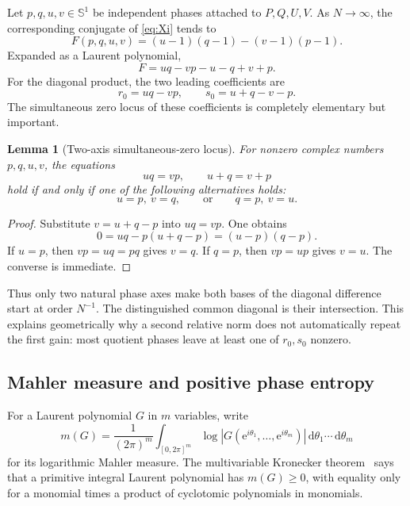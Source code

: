 \documentclass[11pt]{article}
\newtheorem{lemma}[theorem]{Lemma}
\theoremstyle{definition}
\theoremstyle{remark}
\newcommand{\e}{\mathrm e}
\newcommand{\dd}{\,\mathrm d}
\newcommand{\abs}[1]{\left|#1\right|}
\begin{document}
Let $p,q,u,v\in\mathbb S^1$ be independent phases attached to $P,Q,U,V$.
As $N\to\infty$, the corresponding conjugate of \eqref{eq:Xi} tends to
\begin{equation}\label{eq:phasesymbol}
 F(p,q,u,v)=(u-1)(q-1)-(v-1)(p-1).
\end{equation}
Expanded as a Laurent polynomial,
\begin{equation}\label{eq:Fexpanded}
 F=uq-vp-u-q+v+p.
\end{equation}
For the diagonal product, the two leading coefficients are
\begin{equation}\label{eq:r0s0}
 r_0=uq-vp,
 \qquad
 s_0=u+q-v-p.
\end{equation}
The simultaneous zero locus of these coefficients is completely elementary but
important.

\begin{lemma}[Two-axis simultaneous-zero locus]\label{lem:twoaxis}
For nonzero complex numbers $p,q,u,v$, the equations
\[
 uq=vp,
 \qquad
 u+q=v+p
\]
hold if and only if one of the following alternatives holds:
\begin{equation}\label{eq:axes}
 u=p,\ v=q,
 \qquad\text{or}\qquad
 q=p,\ v=u.
\end{equation}
\end{lemma}

\begin{proof}
Substitute $v=u+q-p$ into $uq=vp$.  One obtains
\[
 0=uq-p(u+q-p)=(u-p)(q-p).
\]
If $u=p$, then $vp=uq=pq$ gives $v=q$.  If $q=p$, then $vp=up$ gives $v=u$.
The converse is immediate.
\end{proof}

Thus only two natural phase axes make both bases of the diagonal difference
start at order $N^{-1}$.  The distinguished common diagonal is their
intersection.  This explains geometrically why a second relative norm does not
automatically repeat the first gain: most quotient phases leave at least one of
$r_0,s_0$ nonzero.

\subsection{Mahler measure and positive phase entropy}

For a Laurent polynomial $G$ in $m$ variables, write
\begin{equation}\label{eq:mahlerdef}
 m(G)=\frac1{(2\pi)^m}
 \int_{[0,2\pi]^m}\log\abs{G(\e^{i\theta_1},\ldots,\e^{i\theta_m})}
 \dd\theta_1\cdots\dd\theta_m
\end{equation}
for its logarithmic Mahler measure.  The multivariable Kronecker theorem~\cite{Boyd1981,Lawton1983,Smyth1981} says
that a primitive integral Laurent polynomial has $m(G)\ge0$, with equality only
for a monomial times a product of cyclotomic polynomials in monomials.
\end{document}
